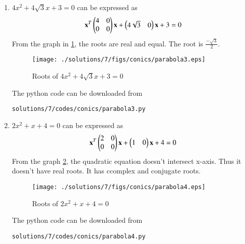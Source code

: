 \begin{enumerate}
\item 
$4x^2 + 4\sqrt{3}x + 3 = 0$ can be expressed as 
\begin{align}
\label{eq:5.2.7_vec_conic_c}
\mathbf{x}^T \begin{pmatrix}4 & 0\\0 & 0\end{pmatrix}\mathbf{x}+ \begin{pmatrix}4\sqrt{3} & 0\end{pmatrix}\mathbf{x}+3=0
\end{align}
From the graph in \ref{fig:5.2.7_fig3}, the roots are real and equal. The root is $\frac{-\sqrt{3}}{2}$.
\begin{figure}[!ht]
\centering
\texttt{[image: ./solutions/7/figs/conics/parabola3.eps]}
\caption{Roots of $4x^2 + 4\sqrt{3}x + 3 = 0$}
\label{fig:5.2.7_fig3}
\end{figure}
The python code can be downloaded from
\begin{lstlisting}
solutions/7/codes/conics/parabola3.py
\end{lstlisting}

\item 
$2x^2 +x + 4 = 0$ can be expressed as 
\begin{align}
\label{eq:5.2.7_vec_conic_d}
\mathbf{x}^T \begin{pmatrix}2 & 0\\0 & 0\end{pmatrix}\mathbf{x}+ \begin{pmatrix}1 & 0\end{pmatrix}\mathbf{x}+4=0
\end{align}
From the graph \ref{fig:5.2.7_fig4}, the quadratic equation doesn't intersect x-axis. Thus it doesn't have real roots. It has ccomplex and conjugate roots.
\begin{figure}[!ht]
\centering
\texttt{[image: ./solutions/7/figs/conics/parabola4.eps]}
\caption{Roots of $2x^2 +x + 4 = 0$ }
\label{fig:5.2.7_fig4}
\end{figure}
The python code can be downloaded from
\begin{lstlisting}
solutions/7/codes/conics/parabola4.py
\end{lstlisting}

\end{enumerate}
